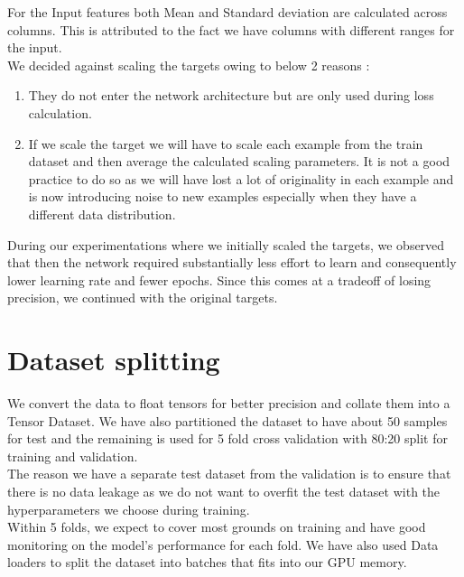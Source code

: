 \documentclass{report} %
\begin{document}
For the Input features both Mean and Standard deviation are calculated across columns. This is attributed to the fact we have columns with different ranges for the input.\\ 

We decided against scaling the targets owing to below 2 reasons :
\begin{enumerate}
    \item They do not enter the network architecture but are only used during loss calculation.
    \item If we scale the target we will have to scale each example from the train dataset and then average the calculated scaling parameters.
    It is not a good practice to do so as we will have lost a lot of originality in each example and is now introducing noise to new examples especially when they have a different data distribution.\\
\end{enumerate}

During our experimentations where we initially scaled the targets, we observed that then the network required substantially less effort to learn and consequently lower learning rate and fewer epochs.
Since this comes at a tradeoff of losing precision, we continued with the original targets.\\

\section{Dataset splitting}\label{sec:Dataset splitting}

We convert the data to float tensors for better precision and collate them into a Tensor Dataset.
We have also partitioned the dataset to have about 50 samples for test and the remaining is used for 5 fold cross validation with 80:20 split for training and validation. \\
The reason we have a separate test dataset from the validation is to ensure that there is no data leakage as we do not want to overfit the test dataset with the hyperparameters we choose during training. \\

Within 5 folds, we expect to cover most grounds on training and have good monitoring on the model's performance for each fold.
We have also used Data loaders to split the dataset into batches that fits into our \ac{GPU} memory.
\end{document}
